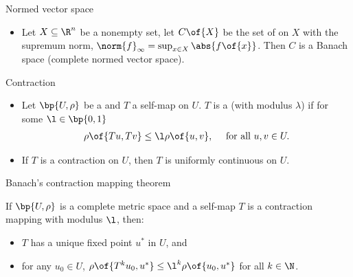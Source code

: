 \documentclass[11pt,xcolor={dvipsnames},aspectratio=159,hyperref={pdftex,pdfpagemode=UseNone,hidelinks,pdfdisplaydoctitle=true},usepdftitle=false]{beamer}
\begin{document}
\begin{frame}{Normed vector space}
    \begin{itemize}
        \item Let $X\subseteq \R^n$ be a nonempty set, let $C\of{X}$ be the set of  on $X$ with the supremum norm, $\norm{f}_\infty = \sup_{x\in X} \abs{f\of{x}}$. Then $C$ is a Banach space (complete normed vector space). 
    \end{itemize}
\end{frame}

\begin{frame}{Contraction}
    \begin{itemize}
        \item Let $\bp{U,\rho}$ be a  and $T$ a self-map on $U$. $T$ is a  (with modulus $\lambda$) if for some $\l\in\bp{0,1}$ \begin{align*}
            \rho\of{Tu,Tv} \leq \l \rho\of{u,v}, \quad \text{ for all } u,v \in U.
        \end{align*}
        \item If $T$ is a contraction on $U$, then $T$ is uniformly continuous on $U$.
    \end{itemize}
\end{frame}

\begin{frame}{Banach's contraction mapping theorem}

    \begin{theorem}
        If $\bp{U,\rho}$ is a complete metric space and a self-map $T$ is a contraction mapping with modulus $\l$, then:
        \begin{itemize}
            \item $T$ has a unique fixed point $u^*$ in $U$, and 
            \item for any $u_0 \in U$, $\rho\of{T^k u_0,u^*} \leq \l^k \rho\of{u_0,u^*}$ for all $k\in\N$.
        \end{itemize}
        \end{theorem}

\end{frame}
\end{document}
